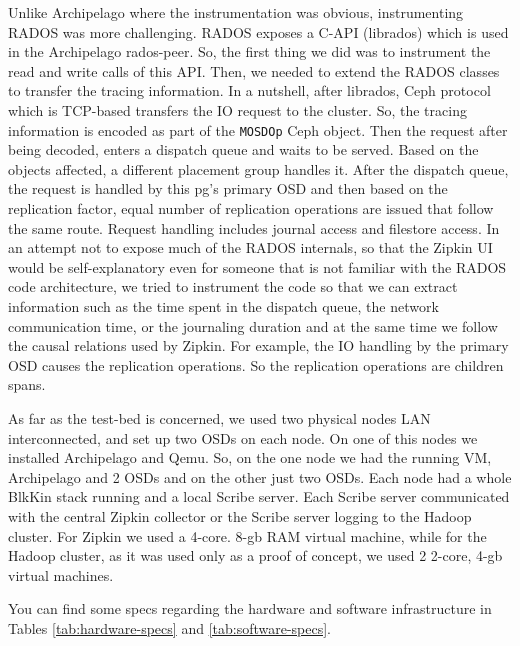 Unlike Archipelago where the instrumentation was obvious, instrumenting RADOS
was more challenging. RADOS exposes a C-API (librados) which is used in the
Archipelago rados-peer. So, the first thing we did was to instrument the read
and write calls of this API. Then, we needed to extend the RADOS classes to
transfer the tracing information. In a nutshell, after librados, Ceph protocol
which is TCP-based transfers the IO request to the cluster. So, the tracing
information is encoded as part of the \texttt{MOSDOp} Ceph object. Then the
request after being decoded, enters a dispatch queue and waits to be served.
Based on the objects affected, a different placement group handles it. After
the dispatch queue, the request is handled by this pg's primary OSD and then
based on the replication factor, equal number of replication operations are
issued that follow the same route. Request handling includes journal access and
filestore access. In an attempt not to expose much of the RADOS internals, so
that the Zipkin UI would be self-explanatory even for someone that is not
familiar with the RADOS code architecture, we tried to instrument the code so
that we can extract information such as the time spent in the dispatch queue,
the network communication time, or the journaling duration and at the same time
we follow the causal relations used by Zipkin. For example, the IO handling by
the primary OSD causes the replication operations. So the replication
operations are children spans.

As far as the test-bed is concerned, we used two physical nodes LAN
interconnected, and set up two OSDs on each node. On one of this nodes we
installed Archipelago and Qemu. So, on the one node we had the running VM,
Archipelago and 2 OSDs and on the other just two OSDs. Each node had a whole
BlkKin stack running and a local Scribe server. Each Scribe server communicated
with the central Zipkin collector or the Scribe server logging to the Hadoop
cluster. For Zipkin we used a 4-core. 8-gb RAM virtual machine, while for the
Hadoop cluster, as it was used only as a proof of concept, we used 2 2-core,
4-gb virtual machines. 

You can find some specs regarding the hardware and software infrastructure in
Tables
\ref{tab:hardware-specs} and \ref{tab:software-specs}. 

